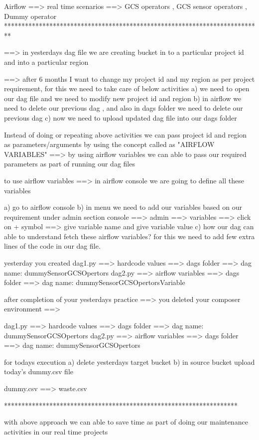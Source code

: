 
Airflow ==> real time scenarios
		==> GCS operators , GCS sensor operators , Dummy operator
**************************************************************************

==> in yesterdays dag file we are creating bucket in to a particular project id and into a particular region

==> after 6 months I want to change my project id and my region as per project requirement, for this we need to take care of below activities
		a) we need to open our dag file and we need to modify new project id and region
		b) in airflow we need to delete our previous dag , and also in dags folder we need to delete our previous dag
		c) now we need to upload updated dag file into our dags folder
		
Instead of doing or repeating above activities we can pass project id and region as parameters/arguments by using the concept called as "AIRFLOW VARIABLES" ==> by using airflow variables we can able to pass our required parameters as part of running our dag files

to use airflow variables ==> in airflow console we are going to define all these variables 

a) go to airflow console 
b) in menu we need to add our variables based on our requirement under admin section 
		console ==> admin ==> variables ==> click on + symbol ==> give variable name and give variable value
c) how our dag can able to understand fetch these airflow variables? for this we need to add few extra lines of the code in our dag file.

yesterday you created 
dag1.py ==> hardcode values ==> dags folder ==> dag name: dummySensorGCSOpertors
dag2.py ==> airflow variables ==> dags folder ==> dag name: dummySensorGCSOpertorsVariable

after completion of your yesterdays practice ==> you deleted your composer environment ==> 

dag1.py ==> hardcode values ==> dags folder ==> dag name: dummySensorGCSOpertors
dag2.py ==> airflow variables ==> dags folder ==> dag name: dummySensorGCSOpertors

for todays execution 
a) delete yesterdays target bucket 
b) in source bucket upload today's dummy.csv file 

dummy.csv ==> waste.csv

*******************************************************************

with above approach we can able to save time as part of doing our maintenance activities in our real time projects

